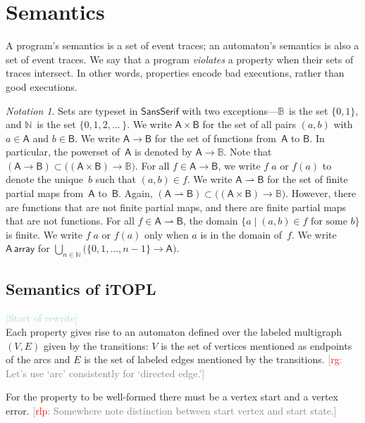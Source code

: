 \documentclass[preprint]{sigplanconf} %
\newcommand{\note}[2]{\textcolor{gray}{[\textcolor{red}{#1}: #2]}}
\newcommand{\rg}[1]{\note{rg}{#1}}
\newcommand{\rlp}[1]{\note{rlp}{#1}}
\newcommand{\B}{\ensuremath{\mathbb{B}}}
\newcommand{\N}{\ensuremath{\mathbb{N}}}
\newcommand{\pmap}{\rightharpoonup}
\newcommand{\set}[1]{\ensuremath{\mathsf{#1}}}
\theoremstyle{definition}
\theoremstyle{remark}
\newtheorem{notation}{Notation}
\begin{document}
\section{Semantics}\label{sec:semantics} %

A program's semantics is a set of event traces;
an automaton's semantics is also a set of event traces.
We say that a program \emph{violates} a property when their sets of traces intersect.
In other words, properties encode bad executions, rather than good executions.

\begin{notation}
Sets are typeset in \set{SansSerif} with two exceptions---$\B$~is the set $\{0,1\}$, and $\N$~is the set $\{0,1,2,\ldots\,\}$.
We write $\set A\times\set B$ for the set of all pairs $(a,b)$ with $a\in\set A$ and $b\in\set B$.
We write $\set A\to\set B$ for the set of functions from~\set A to \set B.
In particular, the powerset of~\set A is denoted by $\set A\to\B$.
Note that $(\set A\to\set B)\subset\bigl((\set A\times\set B)\to\B\bigr)$.
For all $f\in\set A\to\set B$, we write $f\;a$ or $f(a)$ to denote the unique~$b$ such that $(a,b)\in f$.
We write $\set A\pmap\set B$ for the set of finite partial maps from~\set A to~\set B.
Again, $(\set A\pmap\set B)\subset\bigl((\set A\times\set B)\to\B\bigr)$.
However, there are functions that are not finite partial maps, and there are finite partial maps that are not functions.
For all $f\in\set A\pmap\set B$, the domain $\{a\mid\text{$(a,b)\in f$ for some $b$}\}$ is finite.
We write $f\;a$ or $f(a)$ only when $a$ is in the domain of~$f$.
We write $\set A\,\mathsf{array}$ for $\bigcup_{n\in\N} \bigl(\{0,1,\ldots,n-1\}\to\set A\bigr)$.
\end{notation}

\subsection{Semantics of iTOPL}\label{sec:semantics.itopl} %
\textcolor{lightblue}{[Start of rewrite]}\\
Each property gives rise to an automaton defined over the labeled multigraph $(V, E)$ given
by the transitions: $V$ is the set of vertices mentioned as endpoints of
the arcs and $E$ is the set of labeled edges mentioned by the
transitions.
\rg{Let's use `arc' consistently for `directed edge.'}

For the property to be well-formed there must be a vertex start and a
vertex error.
\rlp{Somewhere note distinction between start vertex and start
  state.}
\end{document}
